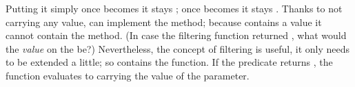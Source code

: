 \documentclass[10 pt]{article}
\begin{document}
   


Putting it simply once  becomes  it stays ; once  becomes  it stays . Thanks to  not carrying any value,  can implement the  method; because  contains a value it cannot contain the  method. (In case the filtering function returned , what would the \emph{value} on the  be?) Nevertheless, the concept of filtering is useful, it only needs to be extended a little; so  contains the  function. If the predicate returns , the function evaluates to  carrying the value of the  parameter. 
\end{document}
